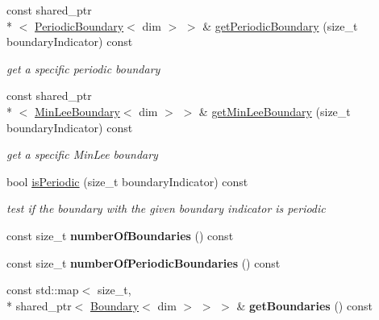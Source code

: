 \begin{DoxyCompactItemize}
const shared\-\_\-ptr\\*
$<$ \hyperlink{classnatrium_1_1PeriodicBoundary}{Periodic\-Boundary}$<$ dim $>$ $>$ \& \hyperlink{classnatrium_1_1BoundaryCollection_ac3a84114a57f0e321a24eaa743a141f3}{get\-Periodic\-Boundary} (size\-\_\-t boundary\-Indicator) const 
\begin{DoxyCompactList}\small\item\em get a specific periodic boundary \end{DoxyCompactList}\item 
const shared\-\_\-ptr\\*
$<$ \hyperlink{classnatrium_1_1MinLeeBoundary}{Min\-Lee\-Boundary}$<$ dim $>$ $>$ \& \hyperlink{classnatrium_1_1BoundaryCollection_aea35fe9645fc3521da83ae83ef84967b}{get\-Min\-Lee\-Boundary} (size\-\_\-t boundary\-Indicator) const 
\begin{DoxyCompactList}\small\item\em get a specific Min\-Lee boundary \end{DoxyCompactList}\item 
\hypertarget{classnatrium_1_1BoundaryCollection_aec4a9de4aaccaa7a49e5308bf9812c66}{bool \hyperlink{classnatrium_1_1BoundaryCollection_aec4a9de4aaccaa7a49e5308bf9812c66}{is\-Periodic} (size\-\_\-t boundary\-Indicator) const }\label{classnatrium_1_1BoundaryCollection_aec4a9de4aaccaa7a49e5308bf9812c66}

\begin{DoxyCompactList}\small\item\em test if the boundary with the given boundary indicator is periodic \end{DoxyCompactList}\item 
\hypertarget{classnatrium_1_1BoundaryCollection_aaebf4e5f32663f1f94c08fdc9902c06f}{const size\-\_\-t {\bfseries number\-Of\-Boundaries} () const }\label{classnatrium_1_1BoundaryCollection_aaebf4e5f32663f1f94c08fdc9902c06f}

\item 
\hypertarget{classnatrium_1_1BoundaryCollection_a29d1d56e79872df40cbdd9a8150dd6d3}{const size\-\_\-t {\bfseries number\-Of\-Periodic\-Boundaries} () const }\label{classnatrium_1_1BoundaryCollection_a29d1d56e79872df40cbdd9a8150dd6d3}

\item 
\hypertarget{classnatrium_1_1BoundaryCollection_ab1454365bef1b79a2bd38148f8037be6}{const std\-::map$<$ size\-\_\-t, \\*
shared\-\_\-ptr$<$ \hyperlink{classnatrium_1_1Boundary}{Boundary}$<$ dim $>$ $>$ $>$ \& {\bfseries get\-Boundaries} () const }\label{classnatrium_1_1BoundaryCollection_ab1454365bef1b79a2bd38148f8037be6}


\end{DoxyCompactItemize}
